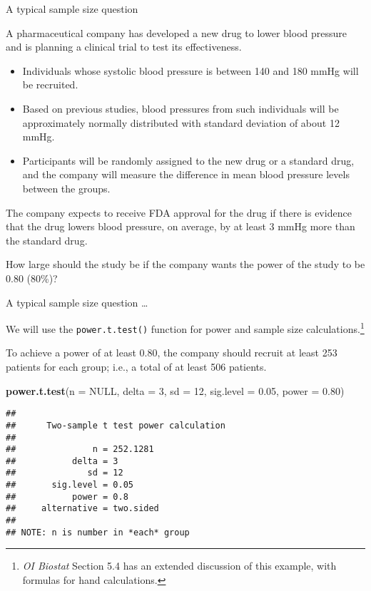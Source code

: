 \documentclass[
  ignorenonframetext,
  aspectratio=169]{beamer}
\newenvironment{Shaded}{\begin{snugshade}}{\end{snugshade}}
\newcommand{\AttributeTok}[1]{\textcolor[rgb]{0.13,0.29,0.53}{#1}}
\newcommand{\ConstantTok}[1]{\textcolor[rgb]{0.56,0.35,0.01}{#1}}
\newcommand{\DecValTok}[1]{\textcolor[rgb]{0.00,0.00,0.81}{#1}}
\newcommand{\FloatTok}[1]{\textcolor[rgb]{0.00,0.00,0.81}{#1}}
\newcommand{\FunctionTok}[1]{\textcolor[rgb]{0.13,0.29,0.53}{\textbf{#1}}}
\newcommand{\NormalTok}[1]{#1}
\begin{document}
\begin{frame}{A typical sample size question}
\protect\hypertarget{a-typical-sample-size-question}{}
\small

A pharmaceutical company has developed a new drug to lower blood
pressure and is planning a clinical trial to test its effectiveness.

\begin{itemize}
\item
  Individuals whose systolic blood pressure is between 140 and 180 mmHg
  will be recruited.
\item
  Based on previous studies, blood pressures from such individuals will
  be approximately normally distributed with standard deviation of about
  12 mmHg.
\item
  Participants will be randomly assigned to the new drug or a standard
  drug, and the company will measure the difference in mean blood
  pressure levels between the groups.
\end{itemize}

The company expects to receive FDA approval for the drug if there is
evidence that the drug lowers blood pressure, on average, by at least 3
mmHg more than the standard drug.

How large should the study be if the company wants the power of the
study to be 0.80 (80\%)?
\end{frame}

\begin{frame}[fragile]{A typical sample size question \ldots}
\protect\hypertarget{a-typical-sample-size-question-1}{}
\small

We will use the \texttt{power.t.test()} function for power and sample
size
calculations.\footnote{\textit{OI Biostat} Section 5.4 has an extended discussion of this example, with formulas for hand calculations.}

To achieve a power of at least 0.80, the company should recruit at least
253 patients for each group; i.e., a total of at least 506 patients.

\scriptsize

\begin{Shaded}
\begin{Highlighting}[]
\FunctionTok{power.t.test}\NormalTok{(}\AttributeTok{n =} \ConstantTok{NULL}\NormalTok{, }\AttributeTok{delta =} \DecValTok{3}\NormalTok{, }\AttributeTok{sd =} \DecValTok{12}\NormalTok{, }\AttributeTok{sig.level =} \FloatTok{0.05}\NormalTok{, }\AttributeTok{power =} \FloatTok{0.80}\NormalTok{)}
\end{Highlighting}
\end{Shaded}

\begin{verbatim}
## 
##      Two-sample t test power calculation 
## 
##               n = 252.1281
##           delta = 3
##              sd = 12
##       sig.level = 0.05
##           power = 0.8
##     alternative = two.sided
## 
## NOTE: n is number in *each* group
\end{verbatim}
\end{frame}
\end{document}
